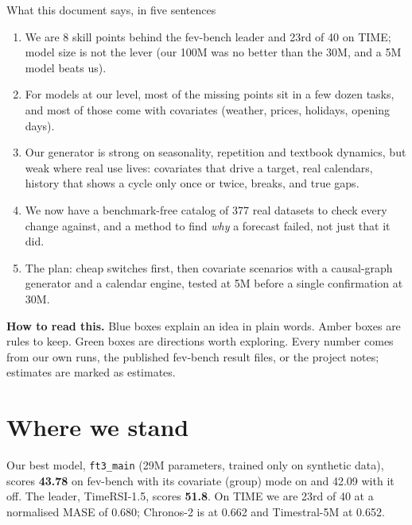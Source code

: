 \documentclass[10pt,a4paper]{article}
\begin{document}
\begin{titlepage}
\vspace{18pt}
{\display\Large What this document says, in five sentences}
\vspace{4pt}
\begin{enumerate}[leftmargin=18pt,itemsep=4pt]
\item We are 8 skill points behind the fev-bench leader and 23rd of 40 on TIME; model size is not the lever (our 100M was no better than the 30M, and a 5M model beats us).
\item For models at our level, most of the missing points sit in a few dozen tasks, and most of those come with covariates (weather, prices, holidays, opening days).
\item Our generator is strong on seasonality, repetition and textbook dynamics, but weak where real use lives: covariates that drive a target, real calendars, history that shows a cycle only once or twice, breaks, and true gaps.
\item We now have a benchmark-free catalog of 377 real datasets to check every change against, and a method to find \emph{why} a forecast failed, not just that it did.
\item The plan: cheap switches first, then covariate scenarios with a causal-graph generator and a calendar engine, tested at 5M before a single confirmation at 30M.
\end{enumerate}

\vfill
\begin{tcolorbox}[colback=black!2,colframe=black!2,arc=3pt,boxrule=0pt,left=8pt,right=8pt]
\small\color{ink2}\textbf{How to read this.} Blue boxes explain an idea in plain words. Amber boxes are rules to keep. Green boxes are directions worth exploring. Every number comes from our own runs, the published fev-bench result files, or the project notes; estimates are marked as estimates.
\end{tcolorbox}
\end{titlepage}

\tableofcontents
\thispagestyle{fancy}
\newpage

\section{Where we stand}

Our best model, \texttt{ft3\_main} (29M parameters, trained only on synthetic data), scores \textbf{43.78} on fev-bench with its covariate (group) mode on and 42.09 with it off. The leader, TimeRSI-1.5, scores \textbf{51.8}. On TIME we are 23rd of 40 at a normalised MASE of 0.680; Chronos-2 is at 0.662 and Timestral-5M at 0.652.
\end{document}
